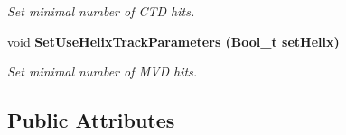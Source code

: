 \begin{CompactItemize}
\begin{CompactList}\small\item\em Set minimal number of CTD hits. \item\end{CompactList}\item 
void \bf{Set\-Use\-Helix\-Track\-Parameters} (Bool\_\-t set\-Helix)\label{classTMiniNtupleAnalyzer_8928626bfe9fc2698193cc248f4a4149}

\begin{CompactList}\small\item\em Set minimal number of MVD hits. \item\end{CompactList}\end{CompactItemize}
\subsection*{Public Attributes}

